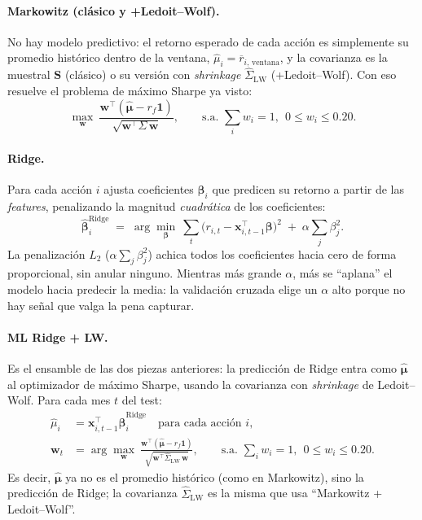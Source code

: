 \documentclass[11pt]{article}
\begin{document}
\paragraph{Markowitz (clásico y +Ledoit--Wolf).} No hay modelo predictivo: el retorno esperado de cada
acción es simplemente su promedio histórico dentro de la ventana,
$\hat{\mu}_i = \overline{r}_{i,\,\text{ventana}}$, y la covarianza es la muestral $\mathbf{S}$ (clásico)
o su versión con \emph{shrinkage} $\hat{\Sigma}_{\text{LW}}$ (+Ledoit--Wolf). Con eso resuelve el
problema de máximo Sharpe ya visto:
\[
\max_{\mathbf{w}}\ \frac{\mathbf{w}^{\top}(\hat{\boldsymbol{\mu}}-r_f\mathbf{1})}
{\sqrt{\mathbf{w}^{\top}\Sigma\,\mathbf{w}}},
\qquad \text{s.a. } \sum_i w_i = 1,\ \ 0\le w_i\le 0.20.
\]
 
\paragraph{Ridge.} Para cada acción $i$ ajusta coeficientes $\boldsymbol{\beta}_i$ que predicen su
retorno a partir de las \emph{features}, penalizando la magnitud \emph{cuadrática} de los
coeficientes:
\[
\hat{\boldsymbol{\beta}}_i^{\text{Ridge}}
\;=\; \arg\min_{\boldsymbol{\beta}}\ \sum_{t}\big(r_{i,t}-\mathbf{x}_{i,t-1}^{\top}\boldsymbol{\beta}\big)^2
\;+\; \alpha\sum_j \beta_j^2 .
\]
La penalización $L_2$ ($\alpha\sum_j\beta_j^2$) achica todos los coeficientes hacia cero de forma
proporcional, sin anular ninguno. Mientras más grande $\alpha$, más se ``aplana'' el modelo hacia
predecir la media: la validación cruzada elige un $\alpha$ alto porque no hay
señal que valga la pena capturar.


\paragraph{ML Ridge + LW.} Es el ensamble de las dos piezas
anteriores: la predicción de Ridge entra como $\hat{\boldsymbol{\mu}}$ al optimizador de máximo
Sharpe, usando la covarianza con \emph{shrinkage} de Ledoit--Wolf. Para cada mes $t$ del test:
\begin{align*}
    \hat{\mu}_{i} &= \mathbf{x}_{i,t-1}^{\top}\hat{\boldsymbol{\beta}}_i^{\text{Ridge}}
\quad\text{para cada acción } i,\\
\mathbf{w}_t &= \arg\max_{\mathbf{w}}\ \frac{\mathbf{w}^{\top}(\hat{\boldsymbol{\mu}}-r_f\mathbf{1})}
{\sqrt{\mathbf{w}^{\top}\hat{\Sigma}_{\text{LW}}\,\mathbf{w}}},
\qquad \text{s.a. } \sum_i w_i = 1,\ \ 0\le w_i\le 0.20.
\end{align*}
Es decir, $\hat{\boldsymbol{\mu}}$ ya no es el promedio histórico (como en Markowitz), sino la
predicción de Ridge; la covarianza $\hat{\Sigma}_{\text{LW}}$ es la misma que usa
``Markowitz + Ledoit--Wolf''.
\end{document}
